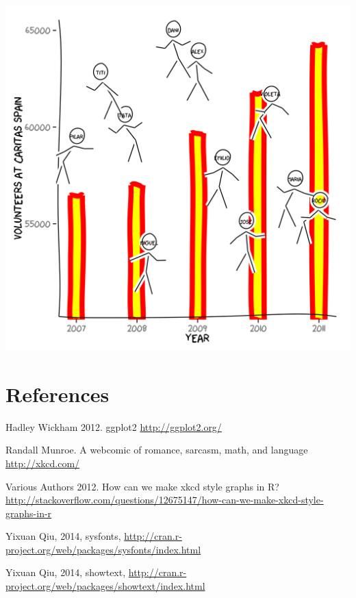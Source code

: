 \documentclass[10pt]{article}
\begin{document}
\begin{center}
\includegraphics{xkcd-intro-CaritasSpain}
\end{center}



\section{References}


    Hadley Wickham 2012. ggplot2 \url{http://ggplot2.org/}
    
    Randall Munroe. A webcomic of romance, sarcasm, math, and language
    \url{http://xkcd.com/}

    Various Authors 2012. How can we make xkcd style graphs in R? \url{http://stackoverflow.com/questions/12675147/how-can-we-make-xkcd-style-graphs-in-r}


    Yixuan Qiu, 2014, sysfonts, \url{http://cran.r-project.org/web/packages/sysfonts/index.html}
    
    Yixuan Qiu, 2014, showtext, \url{http://cran.r-project.org/web/packages/showtext/index.html}
    
\end{document}

